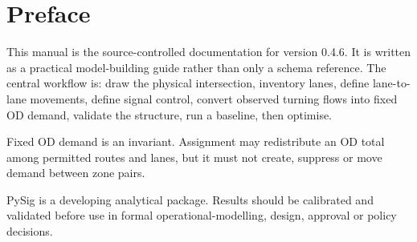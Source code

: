 \chapter*{Preface}
This manual is the source-controlled documentation for \PySig{} version 0.4.6. It is written as a practical model-building guide rather than only a schema reference. The central workflow is: draw the physical intersection, inventory lanes, define lane-to-lane movements, define signal control, convert observed turning flows into fixed OD demand, validate the structure, run a baseline, then optimise.

\begin{modelnote}
Fixed OD demand is an invariant. Assignment may redistribute an OD total among permitted routes and lanes, but it must not create, suppress or move demand between zone pairs.
\end{modelnote}

PySig is a developing analytical package. Results should be calibrated and validated before use in formal operational-modelling, design, approval or policy decisions.
